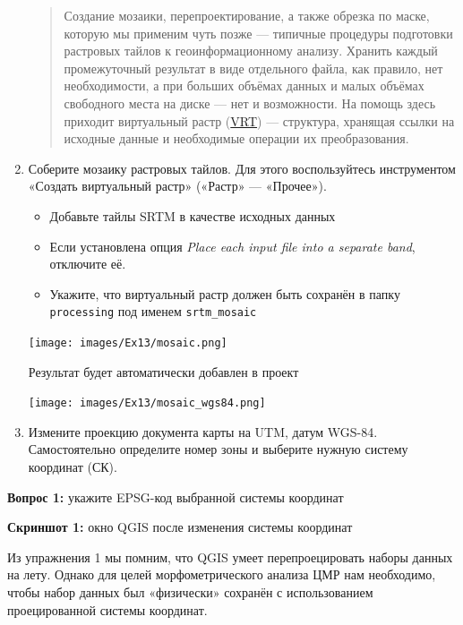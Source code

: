 \documentclass[
  12pt,
]{book}
\begin{document}
\begin{enumerate}
  \begin{quote}
  Создание мозаики, перепроектирование, а также обрезка по маске, которую мы применим чуть позже --- типичные процедуры подготовки растровых тайлов к геоинформационному анализу. Хранить каждый промежуточный результат в виде отдельного файла, как правило, нет необходимости, а при больших объёмах данных и малых объёмах свободного места на диске --- нет и возможности. На помощь здесь приходит виртуальный растр (\href{https://gdal.org/drivers/raster/vrt.html}{VRT}) --- структура, хранящая ссылки на исходные данные и необходимые операции их преобразования.
  \end{quote}
\item
  Соберите мозаику растровых тайлов. Для этого воспользуйтесь инструментом «Создать виртуальный растр» («Растр» --- «Прочее»).

  \begin{itemize}
  \item
    Добавьте тайлы SRTM в качестве исходных данных
  \item
    Если установлена опция \emph{Place each input file into a separate band}, отключите её.
  \item
    Укажите, что виртуальный растр должен быть сохранён в папку \texttt{processing} под именем \texttt{srtm\_mosaic}
  \end{itemize}

  \texttt{[image: images/Ex13/mosaic.png]}

  Результат будет автоматически добавлен в проект

  \texttt{[image: images/Ex13/mosaic\_wgs84.png]}
\item
  Измените проекцию документа карты на UTM, датум WGS-84. Самостоятельно определите номер зоны и выберите нужную систему координат (СК).
\end{enumerate}

\textbf{Вопрос 1:} укажите EPSG-код выбранной системы координат

\textbf{Скриншот 1:} окно QGIS после изменения системы координат

Из упражнения 1 мы помним, что QGIS умеет перепроецировать наборы данных на лету. Однако для целей морфометрического анализа ЦМР нам необходимо, чтобы набор данных был «физически» сохранён с использованием проецированной системы координат.
\end{document}

